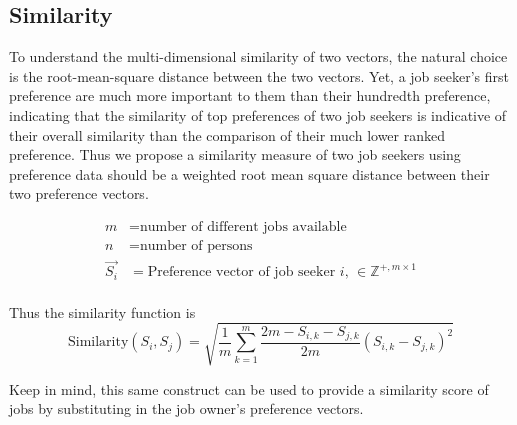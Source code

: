 \subsection{Similarity}

To understand the multi-dimensional similarity of two vectors, the natural choice is the root-mean-square distance between the two vectors. Yet, a job seeker's first preference are much more important to them than their hundredth preference, indicating that the similarity of top preferences of two job seekers is indicative of their overall similarity than the comparison of their much lower ranked preference. Thus we propose a similarity measure of two job seekers using preference data should be a weighted root mean square distance between their two preference vectors.

\begin{align}
m &= \text{number of different jobs available}\\
n &= \text{number of persons}\\
\vec{S_i} &= \text{Preference vector of job seeker $i$, } \in \mathbb{Z}^{+, m \times 1} \\
\end{align}

Thus the similarity function is
\[\text{Similarity}(S_i, S_j) = \sqrt{\frac{1}{m} \sum_{k=1}^{m} \frac{2m - S_{i,k} - S_{j,k}}{2m}(S_{i,k} - S_{j,k})^2}\]

Keep in mind, this same construct can be used to provide a similarity score of jobs by substituting in the job owner's preference vectors.

